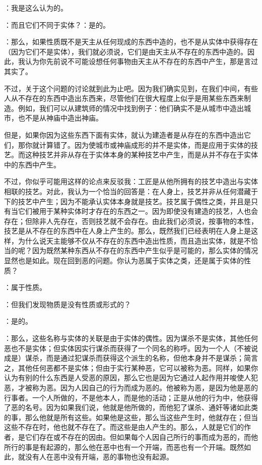 ：我是这么认为的。\par

：而且它们不同于实体？：是的。\par

：那么，如果性质既不是天主从任何现成的东西中造的，也不是从实体中获得存在（因为它们不是实体），我们就必须说，它们是由天主从不存在的东西中造的。因此，我认为你先前说不可能设想任何事物由天主从不存在的东西中产生，那是言过其实了。\par

不过，关于这个问题的讨论就到此为止吧。因为我们确实见到，在我们中间，有些人从不存在的东西中造出东西来，尽管他们在很大程度上似乎是用某些东西来制造。例如，我们可以从建筑师的情况中找到例子：他们确实不是从城市中造出城市，也不是从神庙中造出神庙。\par

但是，如果你因为这些东西下面有实体，就认为建造者是从存在的东西中造出它们，那你就计算错了。因为使城市或神庙成形的并不是实体，而是应用于实体的技艺。而这种技艺并非从存在于实体本身的某种技艺中产生，而是从并不存在于实体中的东西中产生。\par

不过，你似乎可能用这样的论点来反驳我：工匠是从他所拥有的技艺中造出与实体相联的技艺。对此，我认为一个恰当的回答是：在人身上，技艺并非从任何潜藏于下的技艺中产生；因为不能承认实体本身就是技艺。技艺属于偶性之类，并且是只有当它们被用于某种实体时才存在的东西之一。因为即使没有建造的技艺，人也会存在；但除非人先存在，否则技艺就不会存在。由此我们必须说，按事物的本性，技艺是从不存在的东西中在人身上产生的。那么，既然我们已经表明在人身上是这样，为什么说天主能够不仅从不存在的东西中造出性质，而且造出实体，就是不恰当的呢？因为既然某种东西从不存在的东西中产生似乎是可能的，那么实体的情况显然也是如此。现在回到恶的问题。你认为恶属于实体之类，还是属于实体的性质？\par

：属于性质。\par

：但我们发现物质是没有性质或形式的？\par

：是的。\par

：那么，这些名称与实体的关联是由于实体的偶性。因为谋杀不是实体，其他任何恶也不是实体；但实体因实行谋杀而获得了一个同名的称呼。因为一个人（不被说成是）谋杀，而是通过犯谋杀而获得这个派生的名称，但他本身并不是谋杀；简言之，其他任何恶都不是实体；但由于实行某种恶，它可以被称为恶。同样，如果你认为有别的什么东西是人受恶的原因，那么它也是因为它通过人起作用并唆使人犯恶，才被称为恶。因为人因自己的行为而成为恶的。他被称为恶，是因为他是恶的行事者。一个人所做的，不是他本人，而是他的活动；正是从他的行为中，他获得了恶的名号。因为如果我们说，他就是他所做的，而他犯了谋杀、通奸等诸如此类的事，那么他就是所有这些。如果他是这些，那么当这些产生时，他就存在；但当这些不存在时，他也就不存在了。而这些是由人产生的。那么，人就是它们的作者，是它们存在或不存在的因由。但如果每个人因自己所行的事而成为恶的，而他所行的事是有起源的，那么他在恶中也有一个开端，而恶也有一个开端。既然如此，就没有人在恶中没有开端，恶的事物也没有起源。\par

